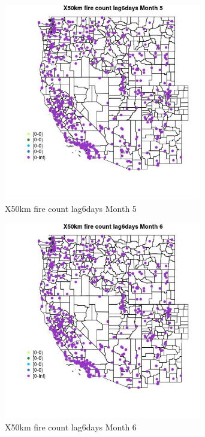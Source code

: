 \begin{figure} 
\centering  
\includegraphics[width=0.77\textwidth]{Code_Outputs/Report_ML_input_PM25_Step4_part_e_de_duplicated_aves_compiled_2019-05-14wNAs_MapObsMo5X50km_fire_count_lag6days.jpg} 
\caption{\label{fig:Report_ML_input_PM25_Step4_part_e_de_duplicated_aves_compiled_2019-05-14wNAsMapObsMo5X50km_fire_count_lag6days}X50km fire count lag6days Month 5} 
\end{figure} 
 

\clearpage 

\begin{figure} 
\centering  
\includegraphics[width=0.77\textwidth]{Code_Outputs/Report_ML_input_PM25_Step4_part_e_de_duplicated_aves_compiled_2019-05-14wNAs_MapObsMo6X50km_fire_count_lag6days.jpg} 
\caption{\label{fig:Report_ML_input_PM25_Step4_part_e_de_duplicated_aves_compiled_2019-05-14wNAsMapObsMo6X50km_fire_count_lag6days}X50km fire count lag6days Month 6} 
\end{figure} 
 

